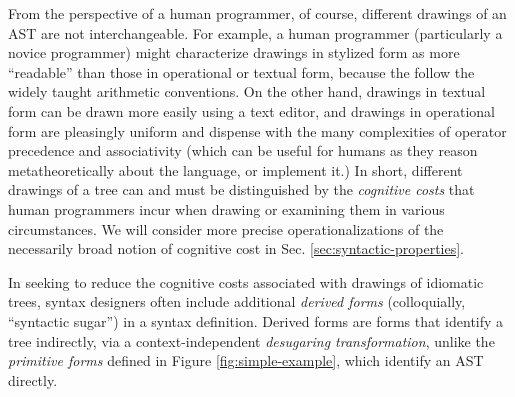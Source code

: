 From the perspective of a human programmer, of course, different drawings of an AST are not interchangeable. For example, a human programmer (particularly a novice programmer) might characterize drawings in stylized form as more ``readable'' than those in operational or textual form, because the follow the widely taught arithmetic conventions. On the other hand, drawings in textual form can be drawn more easily using a text editor, and drawings in operational form are pleasingly uniform and dispense with the many complexities of operator precedence and associativity (which can be useful for humans as they reason metatheoretically about the language, or implement it.) %
In short, different drawings of a tree can and must be distinguished by the \emph{cognitive costs}  that human programmers incur when drawing or examining them in various circumstances. We will consider more precise operationalizations of the necessarily broad notion of cognitive cost in Sec. \ref{sec:syntactic-properties}. %

In seeking to reduce the cognitive costs associated with drawings of idiomatic trees, syntax designers  often  include additional \emph{derived forms} (colloquially, ``syntactic sugar'') in a syntax definition.  Derived forms are forms that identify a tree indirectly, via a context-independent \emph{desugaring transformation}, unlike the \emph{primitive forms} defined in Figure \ref{fig:simple-example}, which identify an AST directly. 

